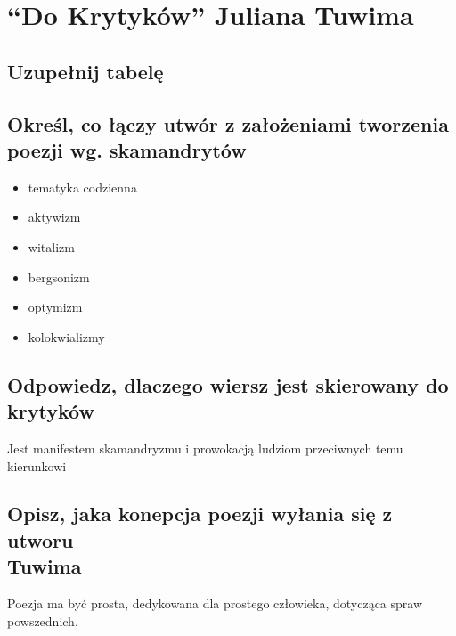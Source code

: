 \documentclass[a4paper]{article}
\begin{document}
\section{``Do Krytyków'' Juliana Tuwima}
\subsection{Uzupełnij tabelę}
\begin{table}[H]
    \centering
\end{table}
\pagebreak
\subsection{Określ, co łączy utwór z założeniami tworzenia poezji wg. skamandrytów}
\begin{itemize}
    \item tematyka codzienna
    \item aktywizm
    \item witalizm
    \item bergsonizm
    \item optymizm
    \item kolokwializmy
\end{itemize}
\subsection{Odpowiedz, dlaczego wiersz jest skierowany do krytyków}
Jest manifestem skamandryzmu i prowokacją ludziom przeciwnych temu kierun\-kowi
\subsection{Opisz, jaka konepcja poezji wyłania się z utworu \\ Tuwima}
Poezja ma być prosta, dedykowana dla prostego człowieka, dotycząca spraw powszednich.
\end{document}
